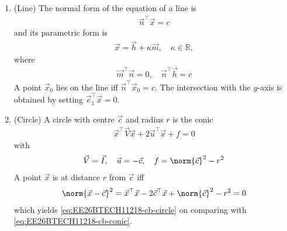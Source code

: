 \begin{enumerate}[label=\thesubsection.\arabic*, ref=\thesubsection.\theenumi,itemsep=1.5em]

\item (Line) The normal form of the equation of a line is
\begin{align}
\vec{n}^{\top}\vec{x} = c
\label{eq:EE26BTECH11218-cb-line-normal}
\end{align}
and its parametric form is
\begin{align}
\vec{x} = \vec{h} + \kappa \vec{m}, \quad \kappa \in \mathbb{R},
\label{eq:EE26BTECH11218-cb-line-param}
\end{align}
where
\begin{align}
\vec{m}^{\top}\vec{n} = 0, \quad \vec{n}^{\top}\vec{h} = c
\end{align}
A point $\vec{x}_0$ lies on the line iff $\vec{n}^{\top}\vec{x}_0 = c$. The intersection with the $y$-axis is obtained by setting $\vec{e}_1^{\top}\vec{x} = 0$.

\item (Circle) A circle with centre $\vec{c}$ and radius $r$ is the conic
\begin{align}
\vec{x}^{\top}\vec{V}\vec{x} + 2\vec{u}^{\top}\vec{x} + f = 0
\label{eq:EE26BTECH11218-cb-conic}
\end{align}
with
\begin{align}
\vec{V} = \vec{I}, \quad \vec{u} = -\vec{c}, \quad f = \norm{\vec{c}}^2 - r^2
\label{eq:EE26BTECH11218-cb-circle}
\end{align}
\solution A point $\vec{x}$ is at distance $r$ from $\vec{c}$ iff
\begin{align}
\norm{\vec{x}-\vec{c}}^2 = \vec{x}^{\top}\vec{x} - 2\vec{c}^{\top}\vec{x} + \norm{\vec{c}}^2 - r^2 = 0
\end{align}
which yields \eqref{eq:EE26BTECH11218-cb-circle} on comparing with \eqref{eq:EE26BTECH11218-cb-conic}.


\end{enumerate}
